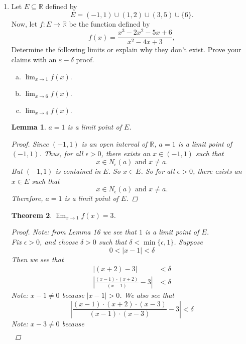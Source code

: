 \documentclass{amsart}
\newtheorem{theorem}{Theorem}
\newtheorem{lemma}[theorem]{Lemma}
\begin{document}
\begin{enumerate}[1.]
\newpage
\item Let $E \subseteq \mathbb{R}$ defined by 
\[ E = (-1,1) \cup (1,2) \cup (3,5) \cup \{6\}.\]
Now, let $f: E \to \mathbb{R}$ be the function defined by 
\[ f(x)=\frac{x^3-2x^2-5x+6}{x^2-4x+3},\]
Determine the following limits or explain why they don't exist. Prove your claims with an $\varepsilon-\delta$ proof. 
\begin{enumerate}[(a)]
\item $\displaystyle \lim_{x\to 1} f(x)$.
\item $\displaystyle \lim_{x\to 6} f(x)$.
\item $\displaystyle \lim_{x\to 4} f(x)$.
\end{enumerate}
\begin{lemma}
    $a = 1$ is a limit point of $E$.
    \begin{proof}
        Since $(-1, 1)$ is an open interval of $\mathbb{R}$, $a = 1$ is a limit point of $(-1, 1)$. 
        Thus, for all $\epsilon > 0$, there exists an $x \in (-1, 1)$ such that
        \[
            x \in N_\epsilon (a) \text{ and } x \neq a.   
        \] 
        But $(-1, 1)$ is contained in $E$. So $x \in E$. 
        So for all $\epsilon >0$, there exists an $x \in E$ such that 
        \[
            x \in N_\epsilon (a) \text{ and } x \neq a.
        \] 
        Therefore, $a = 1$ is a limit point of $E$.
    \end{proof}
\end{lemma}
\begin{theorem}
    $\displaystyle \lim_{x \to 1} f(x) = 3$.
    \begin{proof}
        Note: from Lemma 16 we see that $1$ is a limit point of $E$. \\
        Fix $\epsilon > 0$, and choose $\delta > 0$ such that $\delta < \min\{\epsilon, 1\}$.
        Suppose 
        \[
            0 < |x - 1| < \delta    
        \]
        Then we see that 
        \begin{align*}
            |(x + 2) - 3| &< \delta \\
            \left| \frac{(x - 1)\cdot(x + 2)}{(x - 1)} - 3\right| &< \delta
        \end{align*}
        Note: $x - 1 \neq 0$ because $|x - 1| > 0$.
        We also see that 
        \[
            \left| \frac{(x - 1)\cdot(x + 2)\cdot(x - 3)}{(x - 1)\cdot(x - 3)} - 3\right| < \delta
        \]
        Note: $x - 3 \neq 0$ because 
        \begin{align*}

\end{align*}
\end{proof}
\end{theorem}
\end{enumerate}
\end{document}
